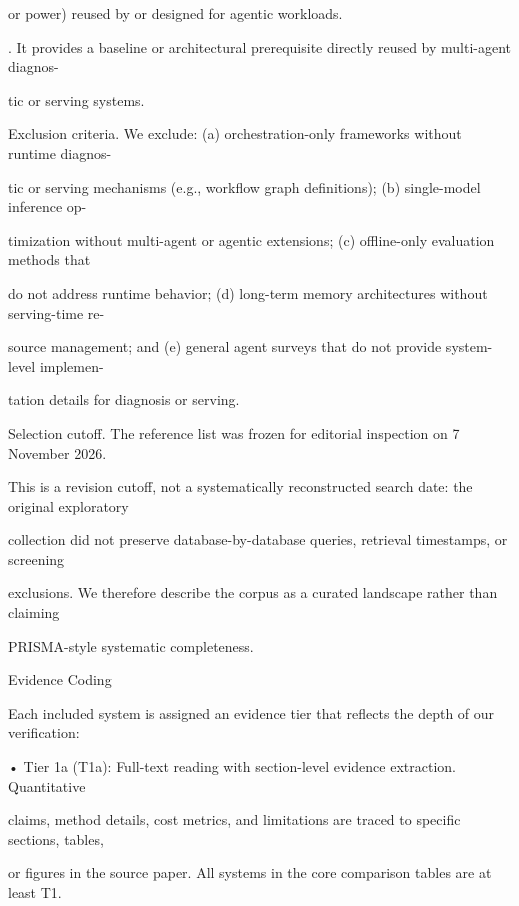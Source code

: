 \begin{flushleft}
\noindent  or power) reused by or designed for agentic workloads.\par
{}. It provides a baseline or architectural prerequisite directly reused by multi-agent diagnos-\par
\noindent  tic or serving systems.\par
\par\smallskip
\noindent Exclusion criteria. We exclude: (a) orchestration-only frameworks without runtime diagnos-\par
\noindent tic or serving mechanisms (e.g., workflow graph definitions); (b) single-model inference op-\par
\noindent timization without multi-agent or agentic extensions; (c) offline-only evaluation methods that\par
\noindent do not address runtime behavior; (d) long-term memory architectures without serving-time re-\par
\noindent source management; and (e) general agent surveys that do not provide system-level implemen-\par
\noindent tation details for diagnosis or serving.\par
\par\smallskip
\noindent Selection cutoff. The reference list was frozen for editorial inspection on 7 November 2026.\par
\noindent This is a revision cutoff, not a systematically reconstructed search date: the original exploratory\par
\noindent collection did not preserve database-by-database queries, retrieval timestamps, or screening\par
\noindent exclusions. We therefore describe the corpus as a curated landscape rather than claiming\par
\noindent PRISMA-style systematic completeness.\par
\par\smallskip
{} Evidence Coding\par
\noindent Each included system is assigned an evidence tier that reflects the depth of our verification:\par
\noindent  • Tier 1a (T1a): Full-text reading with section-level evidence extraction. Quantitative\par
\noindent  claims, method details, cost metrics, and limitations are traced to specific sections, tables,\par
\noindent  or figures in the source paper. All systems in the core comparison tables are at least T1.\par

\end{flushleft}
